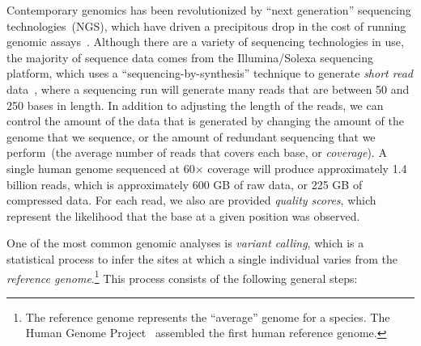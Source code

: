 \documentclass{acm_proc_article-sp}
\begin{document}
Contemporary genomics has been revolutionized by ``next generation'' sequencing
technologies~(NGS), which have driven a precipitous drop in the cost of running genomic
assays~\cite{nhgri}. Although there are a variety of sequencing technologies in use, the majority of
sequence data comes from the Illumina/Solexa sequencing platform, which uses a
``sequencing-by-synthesis'' technique to generate \emph{short read} data~\cite{metzker09}, where a
sequencing run will generate many reads that are between 50 and 250 bases in length. In addition to
adjusting the length of the reads, we can control the amount of the data that is generated by
changing the amount of the genome that we sequence, or the amount of redundant sequencing that
we perform~(the average number of reads that covers each base, or \emph{coverage}). A single
human genome sequenced at 60$\times$ coverage will produce approximately 1.4 billion reads,
which is approximately 600 GB of raw data, or 225 GB of compressed data. For each read, we also
are provided \emph{quality scores}, which represent the likelihood that the base at a given position
was observed.

One of the most common genomic analyses is \emph{variant calling}, which is a statistical process to
infer the sites at which a single individual varies from the \emph{reference genome}.\footnote{The
reference genome represents the ``average'' genome for a species. The Human Genome
Project~\cite{lander01} assembled the first human reference genome.} This process consists of the
following general steps:
\end{document}
